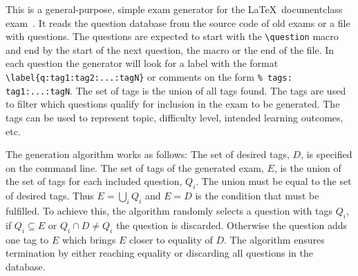 This is a general-purpose, simple exam generator for the \LaTeX\ documentclass 
exam~\cite{exam}.
It reads the question database from the source code of old exams or a file with 
questions.
The questions are expected to start with the \verb'\question' macro and end by 
the start of the next question, the \verb'' macro or the end of 
the file.
In each question the generator will look for a label with the format 
\verb'\label{q:tag1:tag2:...:tagN}' or comments on the form
\verb'% tags: tag1:...:tagN'.
The set of tags is the union of all tags found.
The tags are used to filter which questions qualify for inclusion in the exam 
to be generated.
The tags can be used to represent topic, difficulty level, intended learning 
outcomes, etc.

The generation algorithm works as follows:
The set of desired tags, \(D\), is specified on the command line.
The set of tags of the generated exam, \(E\), is the union of the set of tags 
for each included question, \(Q_i\).
The union must be equal to the set of desired tags.
Thus \(E = \bigcup_i Q_i\) and \(E = D\) is the condition that must be 
fulfilled.
To achieve this, the algorithm randomly selects a question with tags \(Q_i\), 
if \(Q_i\subseteq E\) or \(Q_i\cap D\neq Q_i\) the question is discarded.
Otherwise the question adds one tag to \(E\) which brings \(E\) closer to 
equality of \(D\).
The algorithm ensures termination by either reaching equality or discarding all
questions in the database.
